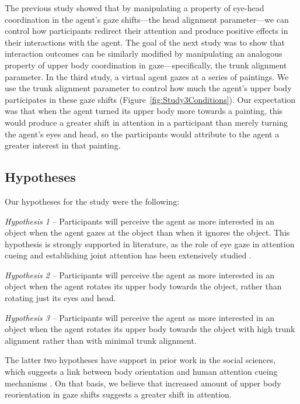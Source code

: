 The previous study showed that by manipulating a property of eye-head coordination in the agent's gaze shifts---the head alignment parameter---we can control how participants redirect their attention and produce positive effects in their interactions with the agent. The goal of the next study was to show that interaction outcomes can be similarly modified by manipulating an analogous property of upper body coordination in gaze---specifically, the trunk alignment parameter. In the third study, a virtual agent gazes at a series of paintings. We use the trunk alignment parameter to control how much the agent's upper body participates in these gaze shifts (Figure~\ref{fig:Study3Conditions}). Our expectation was that when the agent turned its upper body more towards a painting, this would produce a greater shift in attention in a participant than merely turning the agent's eyes and head, so the participants would attribute to the agent a greater interest in that painting.

\subsection{Hypotheses}

Our hypotheses for the study were the following:

\emph{Hypothesis 1} -- Participants will perceive the agent as more interested in an object when the agent gazes at the object than when it ignores the object. This hypothesis is strongly supported in literature, as the role of eye gaze in attention cueing and establishing joint attention has been extensively studied \cite{frischen2007gaze}.

\emph{Hypothesis 2} -- Participants will perceive the agent as more interested in an object when the agent rotates its upper body towards the object, rather than rotating just its eyes and head.

\emph{Hypothesis 3} -- Participants will perceive the agent as more interested in an object when the agent rotates its upper body towards the object with high trunk alignment rather than with minimal trunk alignment.

The latter two hypotheses have support in prior work in the social sciences, which suggests a link between body orientation and human attention cueing mechanisms \cite{hietanen2002social,pomianowska2011socialcues,kendon1973visible,schegloff1998bodytorque}. On that basis, we believe that increased amount of upper body reorientation in gaze shifts suggests a greater shift in attention.


